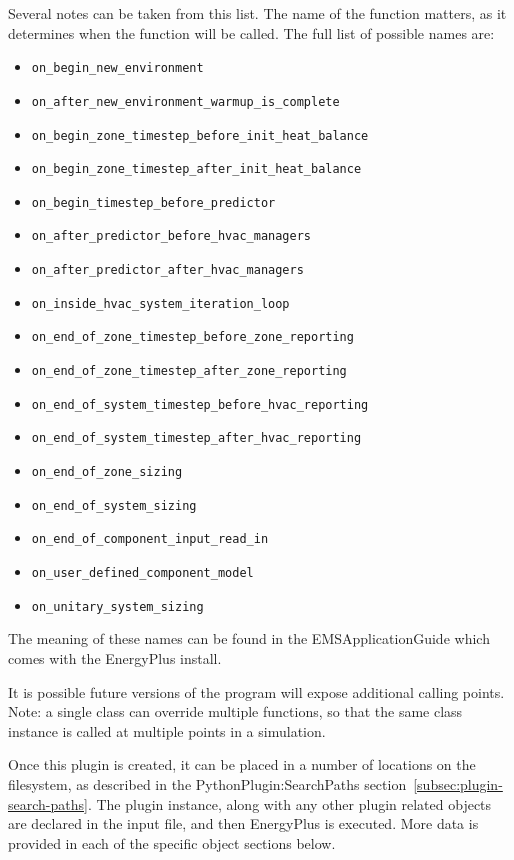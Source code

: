 Several notes can be taken from this list.
The name of the function matters, as it determines when the function will be called.
The full list of possible names are:
\begin{itemize}
    \item \verb=on_begin_new_environment=
    \item \verb=on_after_new_environment_warmup_is_complete=
    \item \verb=on_begin_zone_timestep_before_init_heat_balance=
    \item \verb=on_begin_zone_timestep_after_init_heat_balance=
    \item \verb=on_begin_timestep_before_predictor=
    \item \verb=on_after_predictor_before_hvac_managers=
    \item \verb=on_after_predictor_after_hvac_managers=
    \item \verb=on_inside_hvac_system_iteration_loop=
    \item \verb=on_end_of_zone_timestep_before_zone_reporting=
    \item \verb=on_end_of_zone_timestep_after_zone_reporting=
    \item \verb=on_end_of_system_timestep_before_hvac_reporting=
    \item \verb=on_end_of_system_timestep_after_hvac_reporting=
    \item \verb=on_end_of_zone_sizing=
    \item \verb=on_end_of_system_sizing=
    \item \verb=on_end_of_component_input_read_in=
    \item \verb=on_user_defined_component_model=
    \item \verb=on_unitary_system_sizing=
\end{itemize}

The meaning of these names can be found in the EMSApplicationGuide which comes with the EnergyPlus install.

It is possible future versions of the program will expose additional calling points.
Note: a single class can override multiple functions, so that the same class instance is called at multiple points in a simulation.

Once this plugin is created, it can be placed in a number of locations on the filesystem, as described in the PythonPlugin:SearchPaths section~\ref{subsec:plugin-search-paths}.
The plugin instance, along with any other plugin related objects are declared in the input file, and then EnergyPlus is executed.
More data is provided in each of the specific object sections below.

